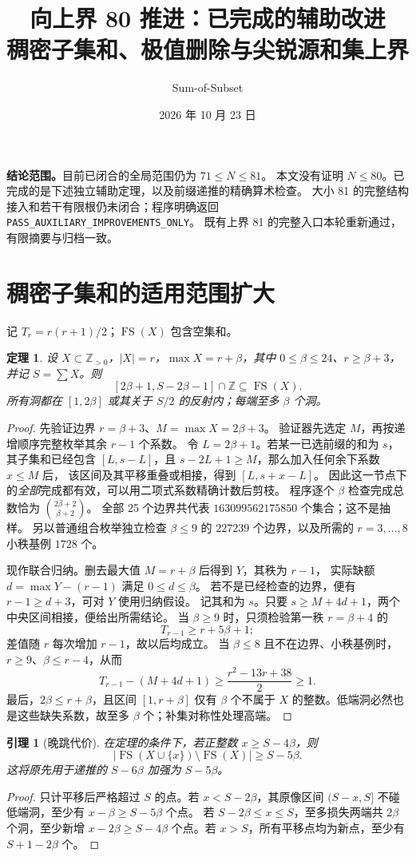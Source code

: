 \documentclass[10pt,a4paper]{article}
\title{向上界 80 推进：已完成的辅助改进\\\large 稠密子集和、极值删除与尖锐源和集上界}
\author{Sum-of-Subset}\date{2026 年 10 月 23 日}
\newcommand{\FS}{\operatorname{FS}}\newcommand{\Z}{\mathbb Z}\newcommand{\T}{T}
\newtheorem{theorem}{定理}\newtheorem{lemma}{引理}
\begin{document}
\maketitle

\noindent\textbf{结论范围。}目前已闭合的全局范围仍为 $71\le N\le81$。
本文没有证明 $N\le80$。已完成的是下述独立辅助定理，以及前缀递推的精确算术检查。
大小 81 的完整结构接入和若干有限根仍未闭合；程序明确返回
\texttt{PASS\_AUXILIARY\_IMPROVEMENTS\_ONLY}。
既有上界 81 的完整入口本轮重新通过，有限摘要与归档一致。

\section{稠密子集和的适用范围扩大}
记 $T_r=r(r+1)/2$；$\FS(X)$ 包含空集和。
\begin{theorem}\label{thm:density}
设 $X\subset\Z_{>0}$，$|X|=r$，$\max X=r+\beta$，其中
$0\le\beta\le24$、$r\ge\beta+3$，并记 $S=\sum X$。则
\[
 [2\beta+1,S-2\beta-1]\cap\Z\subseteq\FS(X).
\]
所有洞都在 $[1,2\beta]$ 或其关于 $S/2$ 的反射内；每端至多 $\beta$ 个洞。
\end{theorem}
\begin{proof}
先验证边界 $r=\beta+3$、$M=\max X=2\beta+3$。
验证器先选定 $M$，再按递增顺序完整枚举其余 $r-1$ 个系数。
令 $L=2\beta+1$。若某一已选前缀的和为 $s$，其子集和已经包含
$[L,s-L]$，且 $s-2L+1\ge M$，那么加入任何余下系数 $x\le M$ 后，
该区间及其平移重叠或相接，得到 $[L,s+x-L]$。
因此这一节点下的\emph{全部}完成都有效，可以用二项式系数精确计数后剪枝。
程序逐个 $\beta$ 检查完成总数恰为 $\binom{2\beta+2}{\beta+2}$。
全部 25 个边界共代表 $163099562175850$ 个集合；这不是抽样。
另以普通组合枚举独立检查 $\beta\le9$ 的 $227239$ 个边界，以及所需的
$r=3,\ldots,8$ 小秩基例 $1728$ 个。

现作联合归纳。删去最大值 $M=r+\beta$ 后得到 $Y$，其秩为 $r-1$，
实际缺额 $d=\max Y-(r-1)$ 满足 $0\le d\le\beta$。
若不是已经检查的边界，便有 $r-1\ge d+3$，可对 $Y$ 使用归纳假设。
记其和为 $s$。只要 $s\ge M+4d+1$，两个中央区间相接，便给出所需结论。
当 $\beta\ge9$ 时，只须检验第一秩 $r=\beta+4$ 的
\[
 T_{r-1}\ge r+5\beta+1;
\]
差值随 $r$ 每次增加 $r-1$，故以后均成立。
当 $\beta\le8$ 且不在边界、小秩基例时，$r\ge9$、$\beta\le r-4$，从而
\[
 T_{r-1}-(M+4d+1)\ge\frac{r^2-13r+38}{2}\ge1.
\]
最后，$2\beta\le r+\beta$，且区间 $[1,r+\beta]$ 仅有 $\beta$ 个不属于 $X$
的整数。低端洞必然也是这些缺失系数，故至多 $\beta$ 个；补集对称性处理高端。
\end{proof}

\begin{lemma}[晚跳代价]
在定理的条件下，若正整数 $x\ge S-4\beta$，则
\[
 |\FS(X\cup\{x\})\setminus\FS(X)|\ge S-5\beta.
\]
这将原先用于递推的 $S-6\beta$ 加强为 $S-5\beta$。
\end{lemma}
\begin{proof}
只计平移后严格超过 $S$ 的点。若 $x<S-2\beta$，其原像区间
$(S-x,S]$ 不碰低端洞，至少有 $x-\beta\ge S-5\beta$ 个点。
若 $S-2\beta\le x\le S$，至多损失两端共 $2\beta$ 个洞，至少新增
$x-2\beta\ge S-4\beta$ 个点。若 $x>S$，所有平移点均为新点，至少有
$S+1-2\beta$ 个。
\end{proof}
\end{document}
